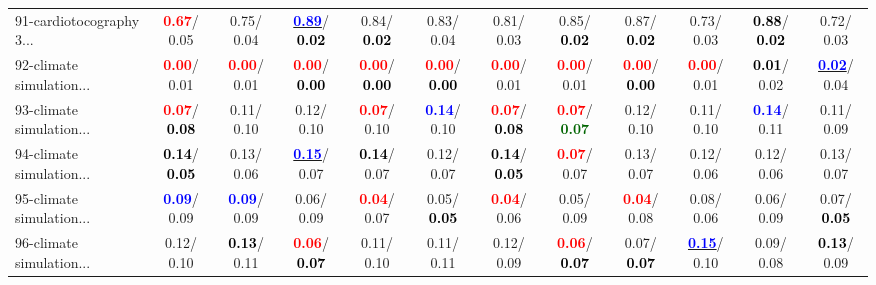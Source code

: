 \begin{table}[h]
\begin{center}
{\begin{tabular}{lc|c|c|c|c|c|c|c|c|c|c}
91-cardiotocography 3... & \textcolor{red}{\textbf{  0.67}}/  0.05 &   0.75/  0.04 & \underline{\textcolor{blue}{\textbf{  0.89}}}/\textcolor{black}{\textbf{  0.02}} &   0.84/\textcolor{black}{\textbf{  0.02}} &   0.83/  0.04 &   0.81/  0.03 &   0.85/\textcolor{black}{\textbf{  0.02}} &   0.87/\textcolor{black}{\textbf{  0.02}} &   0.73/  0.03 & \textcolor{black}{\textbf{  0.88}}/\textcolor{black}{\textbf{  0.02}} &   0.72/  0.03 \\
92-climate simulation... & \textcolor{red}{\textbf{  0.00}}/  0.01 & \textcolor{red}{\textbf{  0.00}}/  0.01 & \textcolor{red}{\textbf{  0.00}}/\textcolor{black}{\textbf{  0.00}} & \textcolor{red}{\textbf{  0.00}}/\textcolor{black}{\textbf{  0.00}} & \textcolor{red}{\textbf{  0.00}}/\textcolor{black}{\textbf{  0.00}} & \textcolor{red}{\textbf{  0.00}}/  0.01 & \textcolor{red}{\textbf{  0.00}}/  0.01 & \textcolor{red}{\textbf{  0.00}}/\textcolor{black}{\textbf{  0.00}} & \textcolor{red}{\textbf{  0.00}}/  0.01 & \textcolor{black}{\textbf{  0.01}}/  0.02 & \underline{\textcolor{blue}{\textbf{  0.02}}}/  0.04 \\ \hline
93-climate simulation... & \textcolor{red}{\textbf{  0.07}}/\textcolor{black}{\textbf{  0.08}} &   0.11/  0.10 &   0.12/  0.10 & \textcolor{red}{\textbf{  0.07}}/  0.10 & \textcolor{blue}{\textbf{  0.14}}/  0.10 & \textcolor{red}{\textbf{  0.07}}/\textcolor{black}{\textbf{  0.08}} & \textcolor{red}{\textbf{  0.07}}/\textcolor{darkgreen}{\textbf{  0.07}} &   0.12/  0.10 &   0.11/  0.10 & \textcolor{blue}{\textbf{  0.14}}/  0.11 &   0.11/  0.09 \\
94-climate simulation... & \textcolor{black}{\textbf{  0.14}}/\textcolor{black}{\textbf{  0.05}} &   0.13/  0.06 & \underline{\textcolor{blue}{\textbf{  0.15}}}/  0.07 & \textcolor{black}{\textbf{  0.14}}/  0.07 &   0.12/  0.07 & \textcolor{black}{\textbf{  0.14}}/\textcolor{black}{\textbf{  0.05}} & \textcolor{red}{\textbf{  0.07}}/  0.07 &   0.13/  0.07 &   0.12/  0.06 &   0.12/  0.06 &   0.13/  0.07 \\
95-climate simulation... & \textcolor{blue}{\textbf{  0.09}}/  0.09 & \textcolor{blue}{\textbf{  0.09}}/  0.09 &   0.06/  0.09 & \textcolor{red}{\textbf{  0.04}}/  0.07 &   0.05/\textcolor{black}{\textbf{  0.05}} & \textcolor{red}{\textbf{  0.04}}/  0.06 &   0.05/  0.09 & \textcolor{red}{\textbf{  0.04}}/  0.08 &   0.08/  0.06 &   0.06/  0.09 &   0.07/\textcolor{black}{\textbf{  0.05}} \\
96-climate simulation... &   0.12/  0.10 & \textcolor{black}{\textbf{  0.13}}/  0.11 & \textcolor{red}{\textbf{  0.06}}/\textcolor{black}{\textbf{  0.07}} &   0.11/  0.10 &   0.11/  0.11 &   0.12/  0.09 & \textcolor{red}{\textbf{  0.06}}/\textcolor{black}{\textbf{  0.07}} &   0.07/\textcolor{black}{\textbf{  0.07}} & \underline{\textcolor{blue}{\textbf{  0.15}}}/  0.10 &   0.09/  0.08 & \textcolor{black}{\textbf{  0.13}}/  0.09 \\\end{tabular}}\label{stratsALCKappa2AllReduxa}
\end{center}
\end{table}
